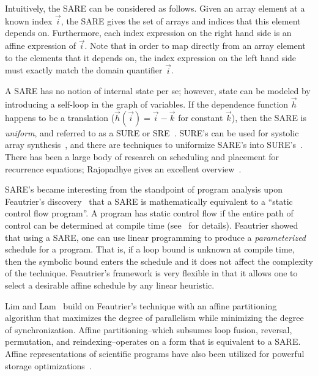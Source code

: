 Intuitively, the SARE can be considered as follows.  Given an array
element at a known index $\vec i$, the SARE gives the set of arrays
and indices that this element depends on.  Furthermore, each index
expression on the right hand side is an affine expression of $\vec i$.
Note that in order to map directly from an array element to the
elements that it depends on, the index expression on the left hand
side must exactly match the domain quantifier $\vec i$.

A SARE has no notion of internal state per se; however, state can be
modeled by introducing a self-loop in the graph of variables.  If the
dependence function ${\vec h}$ happens to be a translation (${\vec
h}({\vec i}) = {\vec i} - {\vec k}$ for constant ${\vec k}$), then the
SARE is {\it uniform}, and referred to as a SURE or
SRE~\cite{Karp67}. SURE's can be used for systolic array
synthesis~\cite{Quinton84}, and there are techniques to uniformize
SARE's into SURE's~\cite{Manjun00}.  There has been a large body of
research on scheduling and placement for recurrence equations;
Rajopadhye gives an excellent overview~\cite{Raj96}.

SARE's became interesting from the standpoint of program analysis upon
Feautrier's discovery~\cite{Feautrier92i,Feautrier92ii} that a SARE is
mathematically equivalent to a ``static control flow program''.  A
program has static control flow if the entire path of control can be
determined at compile time (see~\cite{Feautrier92i,DRV00} for
details).  Feautrier showed that using a SARE, one can use linear
programming to produce a {\it parameterized} schedule for a program.
That is, if a loop bound is unknown at compile time, then the symbolic
bound enters the schedule and it does not affect the complexity of the
technique.  Feautrier's framework is very flexible in that it allows
one to select a desirable affine schedule by any linear heuristic.

Lim and Lam~\cite{Lim01} build on Feautrier's technique with an affine
partitioning algorithm that maximizes the degree of parallelism while
minimizing the degree of synchronization.  Affine partitioning--which
subsumes loop fusion, reversal, permutation, and reindexing--operates
on a form that is equivalent to a SARE.  Affine representations of
scientific programs have also been utilized for powerful storage
optimizations~\cite{Lim01,Quillere,Thies01,Lefebvre98}.
